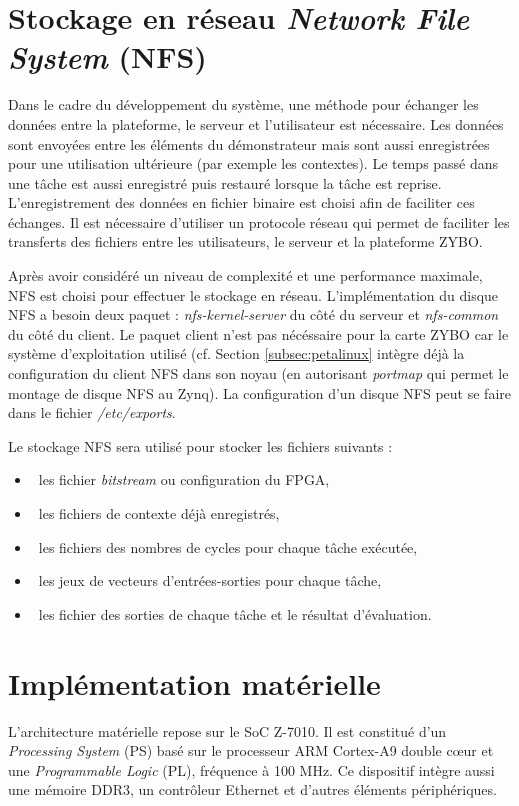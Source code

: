 \section{Stockage en réseau \emph{Network File System} (NFS)}
\label{sec:nfs}
Dans le cadre du développement du système, une méthode pour échanger les données 
entre la plateforme, le serveur et l'utilisateur est nécessaire.
Les données sont envoyées entre les éléments du démonstrateur mais sont aussi enregistrées pour une utilisation ultérieure 
(par exemple les contextes). Le temps passé dans une tâche est aussi enregistré puis restauré lorsque la tâche est reprise.
L'enregistrement des données en fichier binaire est choisi afin de faciliter ces échanges.
Il est nécessaire d'utiliser un protocole réseau qui permet de faciliter les transferts des fichiers entre les utilisateurs,
le serveur et la plateforme ZYBO.

Après  avoir considéré un niveau de complexité et une performance maximale, NFS
est choisi pour effectuer le stockage en réseau.
L'implémentation du disque NFS a besoin deux paquet : \emph{nfs-kernel-server} du côté du serveur et \emph{nfs-common} du côté du client.
Le paquet client n'est pas nécéssaire pour la carte ZYBO car le système d'exploitation utilisé (cf. Section \ref{subsec:petalinux} intègre déjà la configuration du client NFS 
dans son noyau (en autorisant \emph{portmap} qui permet le montage de disque NFS au Zynq). 
La configuration d'un disque NFS peut se faire dans le fichier \emph{/etc/exports}.

Le stockage NFS sera utilisé pour stocker les fichiers suivants :
\begin{itemize}
	\item\ les fichier \emph{bitstream} ou configuration du FPGA,
	\item\ les fichiers de contexte déjà enregistrés,
	\item\ les fichiers des nombres de cycles pour chaque tâche exécutée,
	\item\ les jeux de vecteurs d'entrées-sorties pour chaque tâche,
	\item\ les fichier des sorties de chaque tâche et le résultat d'évaluation.
\end{itemize}

\section{Implémentation matérielle}
\label{sec:materiel}
L'architecture matérielle repose sur le SoC Z-7010. Il est constitué d'un \emph{Processing System} (PS) 
basé sur le processeur ARM Cortex-A9 double cœur et une \emph{Programmable Logic} (PL), 
fréquence à 100 MHz. Ce dispositif intègre aussi une mémoire DDR3,
un contrôleur Ethernet et d'autres éléments périphériques. 

